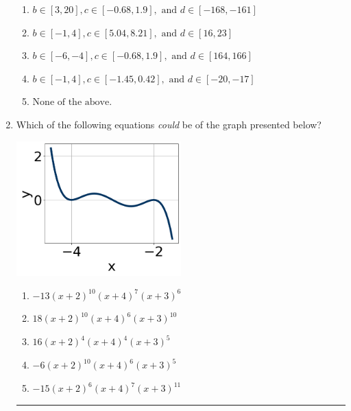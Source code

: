\documentclass[14pt]{extbook}
\newcommand{\litem}[1]{\item#1\hspace*{-1cm}\rule{\textwidth}{0.4pt}}
\begin{document}
\begin{enumerate}
{\begin{enumerate}[label=\Alph*.]
\item \( b \in [3, 20], c \in [-0.68, 1.9], \text{ and } d \in [-168, -161] \)
\item \( b \in [-1, 4], c \in [5.04, 8.21], \text{ and } d \in [16, 23] \)
\item \( b \in [-6, -4], c \in [-0.68, 1.9], \text{ and } d \in [164, 166] \)
\item \( b \in [-1, 4], c \in [-1.45, 0.42], \text{ and } d \in [-20, -17] \)
\item \( \text{None of the above.} \)

\end{enumerate} }
\litem{
Which of the following equations \textit{could} be of the graph presented below?
\begin{center}
    \includegraphics[width=0.5\textwidth]{../Figures/polyGraphToFunctionCopyA.png}
\end{center}
\begin{enumerate}[label=\Alph*.]
\item \( -13(x + 2)^{10} (x + 4)^{7} (x + 3)^{6} \)
\item \( 18(x + 2)^{10} (x + 4)^{6} (x + 3)^{10} \)
\item \( 16(x + 2)^{4} (x + 4)^{4} (x + 3)^{5} \)
\item \( -6(x + 2)^{10} (x + 4)^{6} (x + 3)^{5} \)
\item \( -15(x + 2)^{6} (x + 4)^{7} (x + 3)^{11} \)


\end{enumerate}}
\end{enumerate}
\end{document}
